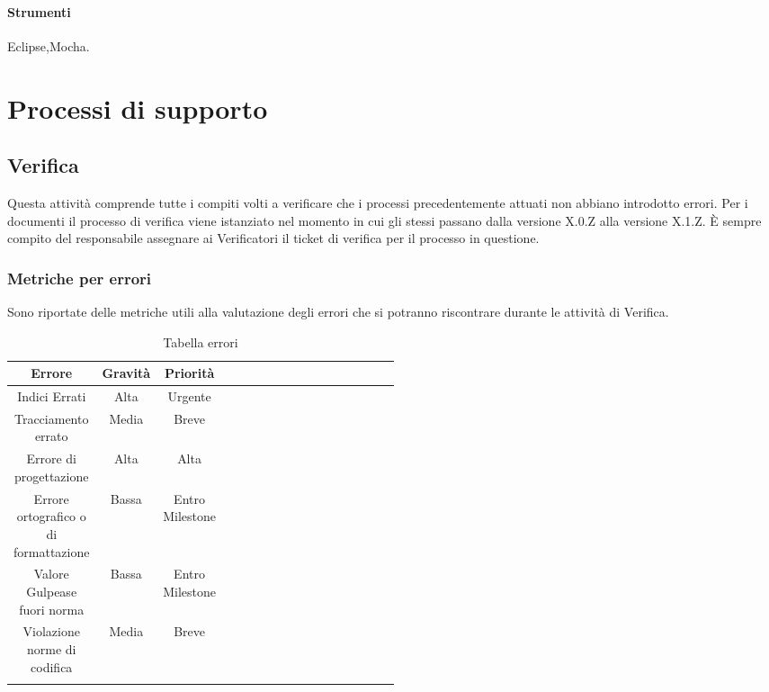 \paragraph{Strumenti}

Eclipse,Mocha.


\section{Processi di supporto}

\subsection{Verifica}
Questa attività comprende tutte i compiti volti a verificare che i processi precedentemente attuati non abbiano introdotto errori.
Per i documenti il processo di verifica viene istanziato nel momento in cui gli stessi passano dalla versione X.0.Z alla versione X.1.Z. 
È sempre compito del responsabile assegnare ai Verificatori il ticket di verifica per il processo in questione.

\subsubsection{Metriche per errori}
Sono riportate delle metriche utili alla valutazione degli errori che si potranno riscontrare durante le attività di Verifica.
\begin{center}
\begin{longtable}{|c|c|c|p{0.5\linewidth}|}
\toprule
\textbf{Errore} & \textbf{Gravità} & \textbf{Priorità} \\

\midrule
Indici Errati & Alta & Urgente\\
\midrule
Tracciamento errato & Media & Breve\\
\midrule
Errore di progettazione & Alta & Alta\\
\midrule
Errore ortografico o di formattazione & Bassa & Entro Milestone\\
\midrule
Valore Gulpease fuori norma & Bassa & Entro Milestone\\
\midrule
Violazione norme di codifica & Media & Breve\\

\bottomrule
\caption{Tabella errori}
\label{tab:changelog}
\end{longtable}
\end{center}

